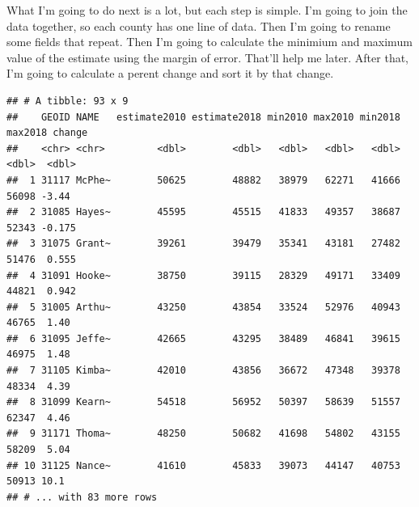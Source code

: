 \documentclass[]{book}
\newenvironment{Shaded}{\begin{snugshade}}{\end{snugshade}}
\newcommand{\DataTypeTok}[1]{\textcolor[rgb]{0.13,0.29,0.53}{#1}}
\newcommand{\DecValTok}[1]{\textcolor[rgb]{0.00,0.00,0.81}{#1}}
\newcommand{\KeywordTok}[1]{\textcolor[rgb]{0.13,0.29,0.53}{\textbf{#1}}}
\newcommand{\NormalTok}[1]{#1}
\newcommand{\OperatorTok}[1]{\textcolor[rgb]{0.81,0.36,0.00}{\textbf{#1}}}
\newcommand{\StringTok}[1]{\textcolor[rgb]{0.31,0.60,0.02}{#1}}
\begin{document}
What I'm going to do next is a lot, but each step is simple. I'm going to join the data together, so each county has one line of data. Then I'm going to rename some fields that repeat. Then I'm going to calculate the minimium and maximum value of the estimate using the margin of error. That'll help me later. After that, I'm going to calculate a perent change and sort it by that change.

\begin{Shaded}
\end{Shaded}

\begin{verbatim}
## # A tibble: 93 x 9
##    GEOID NAME   estimate2010 estimate2018 min2010 max2010 min2018 max2018 change
##    <chr> <chr>         <dbl>        <dbl>   <dbl>   <dbl>   <dbl>   <dbl>  <dbl>
##  1 31117 McPhe~        50625        48882   38979   62271   41666   56098 -3.44 
##  2 31085 Hayes~        45595        45515   41833   49357   38687   52343 -0.175
##  3 31075 Grant~        39261        39479   35341   43181   27482   51476  0.555
##  4 31091 Hooke~        38750        39115   28329   49171   33409   44821  0.942
##  5 31005 Arthu~        43250        43854   33524   52976   40943   46765  1.40 
##  6 31095 Jeffe~        42665        43295   38489   46841   39615   46975  1.48 
##  7 31105 Kimba~        42010        43856   36672   47348   39378   48334  4.39 
##  8 31099 Kearn~        54518        56952   50397   58639   51557   62347  4.46 
##  9 31171 Thoma~        48250        50682   41698   54802   43155   58209  5.04 
## 10 31125 Nance~        41610        45833   39073   44147   40753   50913 10.1  
## # ... with 83 more rows
\end{verbatim}
\end{document}
